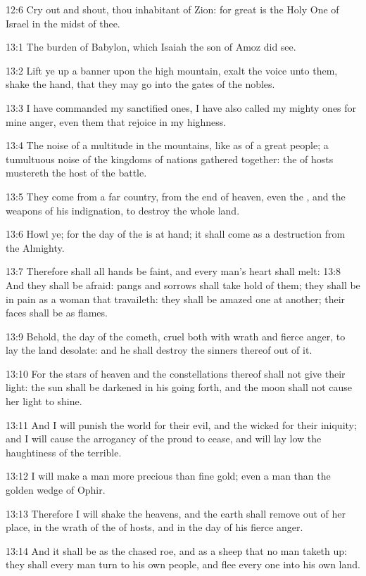 12:6 Cry out and shout, thou inhabitant of Zion: for great is the Holy
One of Israel in the midst of thee.

13:1 The burden of Babylon, which Isaiah the son of Amoz did see.

13:2 Lift ye up a banner upon the high mountain, exalt the voice unto
them, shake the hand, that they may go into the gates of the nobles.

13:3 I have commanded my sanctified ones, I have also called my mighty
ones for mine anger, even them that rejoice in my highness.

13:4 The noise of a multitude in the mountains, like as of a great
people; a tumultuous noise of the kingdoms of nations gathered
together: the \LORD of hosts mustereth the host of the battle.

13:5 They come from a far country, from the end of heaven, even the
\LORD, and the weapons of his indignation, to destroy the whole land.

13:6 Howl ye; for the day of the \LORD is at hand; it shall come as a
destruction from the Almighty.

13:7 Therefore shall all hands be faint, and every man's heart shall
melt: 13:8 And they shall be afraid: pangs and sorrows shall take hold
of them; they shall be in pain as a woman that travaileth: they shall
be amazed one at another; their faces shall be as flames.

13:9 Behold, the day of the \LORD cometh, cruel both with wrath and
fierce anger, to lay the land desolate: and he shall destroy the
sinners thereof out of it.

13:10 For the stars of heaven and the constellations thereof shall not
give their light: the sun shall be darkened in his going forth, and
the moon shall not cause her light to shine.

13:11 And I will punish the world for their evil, and the wicked for
their iniquity; and I will cause the arrogancy of the proud to cease,
and will lay low the haughtiness of the terrible.

13:12 I will make a man more precious than fine gold; even a man than
the golden wedge of Ophir.

13:13 Therefore I will shake the heavens, and the earth shall remove
out of her place, in the wrath of the \LORD of hosts, and in the day of
his fierce anger.

13:14 And it shall be as the chased roe, and as a sheep that no man
taketh up: they shall every man turn to his own people, and flee every
one into his own land.


